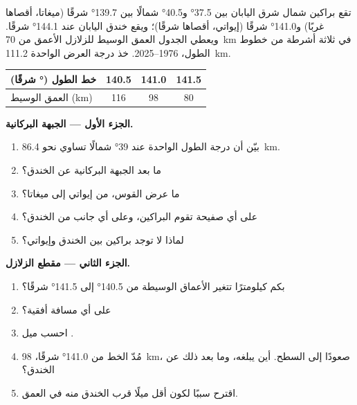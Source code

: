 \begin{problem}
\label{pb:g12:subduction-magmatism:1}
تقع براكين شمال شرق اليابان بين \ang{37.5} و\ang{40.5} شمالًا
بين \ang{139.7} شرقًا (ميغاتا، أقصاها غربًا) و\ang{141.0} شرقًا (إيواتي،
أقصاها شرقًا)؛ ويقع خندق اليابان عند \ang{144.1} شرقًا. ويعطي الجدول
العمق الوسيط للزلازل الأعمق من \qty{70}{km} في ثلاثة أشرطة من
خطوط الطول، 1976--2025. خذ درجة العرض الواحدة \qty{111.2}{km}.

\begin{center}
\small
\begin{tabular}{|l|c|c|c|}
\hline
خط الطول (\unit{\degree} شرقًا) & 140.5 & 141.0 & 141.5 \\ \hline
العمق الوسيط (\unit{km}) & 116 & 98 & 80 \\ \hline
\end{tabular}
\end{center}

\medskip
\noindent\textbf{الجزء الأول --- الجبهة البركانية.}
\begin{enumerate}
  \item بيّن أن درجة الطول الواحدة عند \ang{39} شمالًا تساوي نحو
        \qty{86.4}{km}.
  \item ما بعد الجبهة البركانية عن الخندق؟
  \item ما عرض القوس، من إيواتي إلى ميغاتا؟
  \item على أي صفيحة تقوم البراكين، وعلى أي جانب من
        الخندق؟
  \item لماذا لا توجد براكين بين الخندق وإيواتي؟
\end{enumerate}

\medskip
\noindent\textbf{الجزء الثاني --- مقطع الزلازل.}
\begin{enumerate}[resume]
  \item بكم كيلومترًا تتغير الأعماق الوسيطة من
        \ang{140.5} إلى \ang{141.5} شرقًا؟
  \item على أي مسافة أفقية؟
  \item احسب ميل .
  \item مُدّ الخط من \ang{141.0} شرقًا، \qty{98}{km}، صعودًا إلى
        السطح. أين يبلغه، وما بعد ذلك عن الخندق؟
  \item اقترح سببًا لكون  أقل ميلًا قرب الخندق منه في العمق.
\end{enumerate}


\end{problem}
